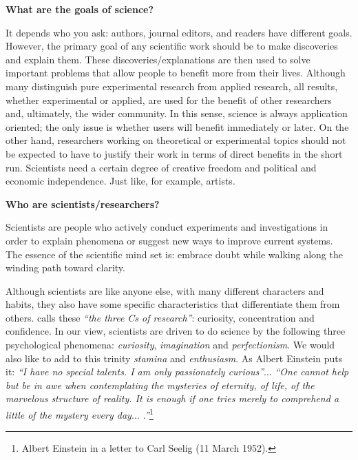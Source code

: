\documentclass[graybox,envcountchap,sectrefs,UStrade]{svmono}
\begin{document}
\begin{flushleft}
\textbf{What are the goals of science?}
\end{flushleft}

\noindent It depends who you ask: authors, journal editors, and readers have different goals. However, the primary goal of any scientific work should be to make discoveries and explain them. These discoveries/explanations are then used to solve important problems that allow people to benefit more from their lives. Although many distinguish pure experimental research from applied research, all results, whether experimental or applied, are used for the benefit of other researchers and, ultimately, the wider community. In this sense, science is always application oriented; the only issue is whether users will benefit immediately or later. On the other hand, researchers working on theoretical or experimental topics should not be expected to have to justify their work in terms of direct benefits in the short run. Scientists need a certain degree of creative freedom and political and economic independence. Just like, for example, artists.\par

\begin{flushleft}
\textbf{Who are scientists/researchers?}
\end{flushleft}

\noindent Scientists are people who actively conduct experiments and investigations in order to explain phenomena or suggest new ways to improve current systems. The essence of the scientific mind set is: embrace doubt while walking along the winding path toward clarity.\par

Although scientists are like anyone else, with many different characters and habits, they also have some specific characteristics that differentiate them from others. \citet{Creedy2008research} calls these \emph{``the three Cs of research''}: curiosity, concentration and confidence. In our view, scientists are driven to do science by the following three psychological phenomena: \emph{curiosity}, \emph{imagination} and \emph{perfectionism}. We would also like to add to this trinity \emph{stamina} and \emph{enthusiasm}. As Albert Einstein puts it: \emph{``I have no special talents. I am only passionately curious''}$\ldots$ \emph{``One cannot help but be in awe when contemplating the mysteries of eternity, of life, of the marvelous structure of reality. It is enough if one tries merely to comprehend a little of the mystery every day$\ldots$ .''}\footnote{Albert Einstein in a letter to Carl Seelig (11 March 1952).}
\end{document}
